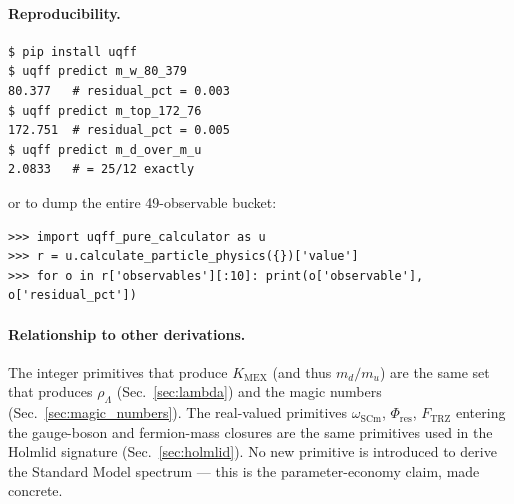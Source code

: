 \paragraph{Reproducibility.}
\begin{verbatim}
$ pip install uqff
$ uqff predict m_w_80_379
80.377   # residual_pct = 0.003
$ uqff predict m_top_172_76
172.751  # residual_pct = 0.005
$ uqff predict m_d_over_m_u
2.0833   # = 25/12 exactly
\end{verbatim}
or to dump the entire 49-observable bucket:
\begin{verbatim}
>>> import uqff_pure_calculator as u
>>> r = u.calculate_particle_physics({})['value']
>>> for o in r['observables'][:10]: print(o['observable'], o['residual_pct'])
\end{verbatim}

\paragraph{Relationship to other derivations.}
The integer primitives that produce
$K_{\text{MEX}}$ (and thus $m_d/m_u$) are the same set that produces
$\rho_\Lambda$ (Sec.~\ref{sec:lambda}) and the magic numbers
(Sec.~\ref{sec:magic_numbers}). The real-valued primitives
$\omega_{\text{SCm}}$, $\Phi_{\text{res}}$, $F_{\text{TRZ}}$ entering the
gauge-boson and fermion-mass closures are the same primitives used in
the Holmlid signature (Sec.~\ref{sec:holmlid}). No new primitive is
introduced to derive the Standard Model spectrum --- this is the
parameter-economy claim, made concrete.

